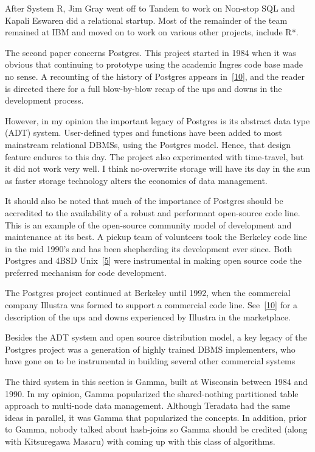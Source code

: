 \documentclass[b5paper,11pt,twoside,openright]{book}
\begin{document}
After System R, Jim Gray went off to Tandem to work on Non-stop SQL and
Kapali Eswaren did a relational startup. Most of the remainder of the
team remained at IBM and moved on to work on various other projects,
include R*.

The second paper concerns Postgres. This project started in 1984 when it
was obvious that continuing to prototype using the academic Ingres code
base made no sense. A recounting of the history of Postgres appears
in~{{[}\protect\hyperlink{ref-stonebraker-turing}{10}{]}}, and the
reader is directed there for a full blow-by-blow recap of the ups and
downs in the development process.

However, in my opinion the important legacy of Postgres is its abstract
data type (ADT) system. User-defined types and functions have been added
to most mainstream relational DBMSs, using the Postgres model. Hence,
that design feature endures to this day. The project also experimented
with time-travel, but it did not work very well. I think no-overwrite
storage will have its day in the sun as faster storage technology alters
the economics of data management.

It should also be noted that much of the importance of Postgres should
be accredited to the availability of a robust and performant open-source
code line. This is an example of the open-source community model of
development and maintenance at its best. A pickup team of volunteers
took the Berkeley code line in the mid 1990's and has been shepherding
its development ever since. Both Postgres and 4BSD
Unix~{{[}\protect\hyperlink{ref-bsdunix}{5}{]}} were instrumental in
making open source code the preferred mechanism for code development.

The Postgres project continued at Berkeley until 1992, when the
commercial company Illustra was formed to support a commercial code
line. See~{{[}\protect\hyperlink{ref-stonebraker-turing}{10}{]}} for a
description of the ups and downs experienced by Illustra in the
marketplace.

Besides the ADT system and open source distribution model, a key legacy
of the Postgres project was a generation of highly trained DBMS
implementers, who have gone on to be instrumental in building several
other commercial systems

The third system in this section is Gamma, built at Wisconsin between
1984 and 1990. In my opinion, Gamma popularized the shared-nothing
partitioned table approach to multi-node data management. Although
Teradata had the same ideas in parallel, it was Gamma that popularized
the concepts. In addition, prior to Gamma, nobody talked about
hash-joins so Gamma should be credited (along with Kitsuregawa Masaru)
with coming up with this class of algorithms.
\end{document}
